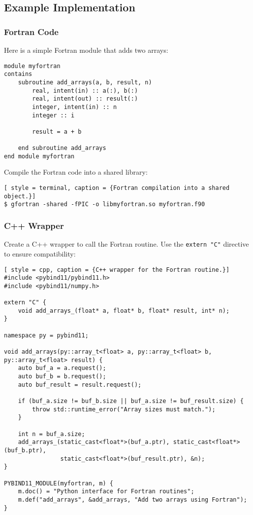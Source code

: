 \subsection{Example Implementation}
\subsubsection{Fortran Code}
Here is a simple Fortran module that adds two arrays:
\begin{lstlisting}[style=fortran, caption={Fortran routine to add arrays.}]
module myfortran
contains
    subroutine add_arrays(a, b, result, n)
        real, intent(in) :: a(:), b(:)
        real, intent(out) :: result(:)
        integer, intent(in) :: n
        integer :: i

        result = a + b
        
    end subroutine add_arrays
end module myfortran
\end{lstlisting}

Compile the Fortran code into a shared library:
\begin{lstlisting}[ style = terminal, caption = {Fortran compilation into a shared object.}]
$ gfortran -shared -fPIC -o libmyfortran.so myfortran.f90
\end{lstlisting}

\subsubsection{C++ Wrapper}
Create a C++ wrapper to call the Fortran routine. Use the \texttt{extern "C"} directive to ensure compatibility:
\begin{lstlisting}[ style = cpp, caption = {C++ wrapper for the Fortran routine.}]
#include <pybind11/pybind11.h>
#include <pybind11/numpy.h>

extern "C" {
    void add_arrays_(float* a, float* b, float* result, int* n);
}

namespace py = pybind11;

void add_arrays(py::array_t<float> a, py::array_t<float> b, py::array_t<float> result) {
    auto buf_a = a.request();
    auto buf_b = b.request();
    auto buf_result = result.request();

    if (buf_a.size != buf_b.size || buf_a.size != buf_result.size) {
        throw std::runtime_error("Array sizes must match.");
    }

    int n = buf_a.size;
    add_arrays_(static_cast<float*>(buf_a.ptr), static_cast<float*>(buf_b.ptr),
                static_cast<float*>(buf_result.ptr), &n);
}

PYBIND11_MODULE(myfortran, m) {
    m.doc() = "Python interface for Fortran routines";
    m.def("add_arrays", &add_arrays, "Add two arrays using Fortran");
}
\end{lstlisting}

